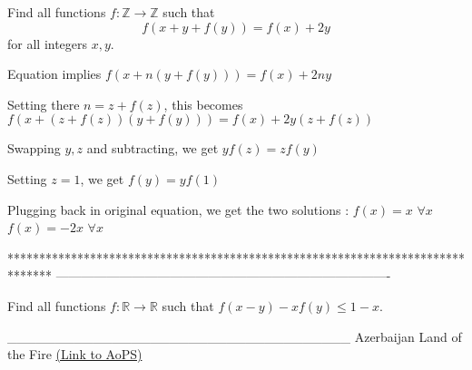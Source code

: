 \begin{solution}
	\begin{tcolorbox}Find all functions $ f:\mathbb{Z}\rightarrow \mathbb{Z} $ such that \[f(x+y+f(y))=f(x)+2y\]
for all integers $ x,y $.\end{tcolorbox}
Equation implies $f(x+n(y+f(y)))=f(x)+2ny$

Setting there $n=z+f(z)$, this becomes $f(x+(z+f(z))(y+f(y)))=f(x)+2y(z+f(z))$

Swapping $y,z$ and subtracting, we get $yf(z)=zf(y)$

Setting $z=1$, we get $f(y)=yf(1)$

Plugging back in original equation, we get the two solutions :
$f(x)=x$ $\forall x$
$f(x)=-2x$ $\forall x$
\end{solution}



*******************************************************************************
-------------------------------------------------------------------------------

\begin{problem}
	Find all functions $f: \mathbb{R}\to\mathbb{R}$ such that $f(x-y)-xf(y)\leq1-x$.


____________________________________
Azerbaijan Land of the Fire 
	\flushright \href{https://artofproblemsolving.com/community/c6h478022}{(Link to AoPS)}
\end{problem}



